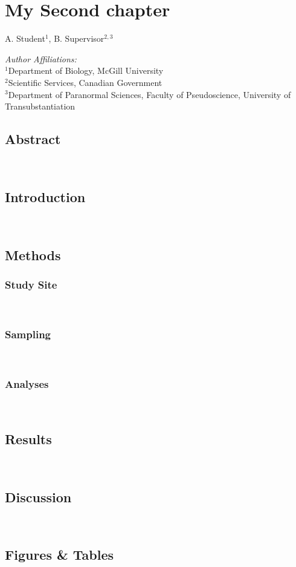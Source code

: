 \chapter{My Second chapter}
\begin{center}
{A. Student$^{1}$, B. Supervisor$^{2,3}$}\\
\end{center}
\textit{Author Affiliations:}\\
\normalsize{$^{1}$Department of Biology, McGill University}\\
\normalsize{$^{2}$Scientific Services, Canadian Government}\\
\normalsize{$^{3}$Department of Paranormal Sciences, Faculty of Pseudoscience, University of Transubstantiation}\\
\section{Abstract}
\lipsum[66]
\\
\section{Introduction}
\lipsum[66]
\\
\section{Methods}

\subsection*{Study Site}
\lipsum[66]\\
\subsection*{Sampling}
\lipsum[66]\\
\subsection*{Analyses}
\lipsum[66]\\
\section{Results}
\lipsum[66]\\
\section{Discussion}
\lipsum[66]\\

\newpage
\section*{Figures \& Tables}
